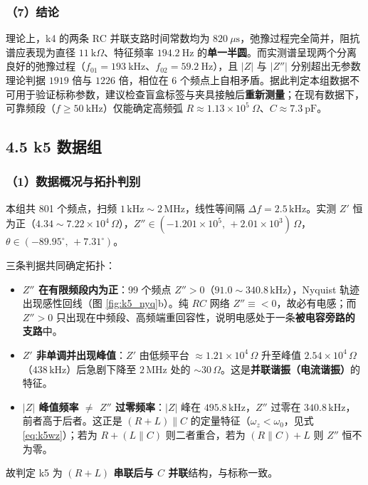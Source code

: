\documentclass[12pt,a4paper]{ctexart}
\begin{document}
\subsubsection*{（7）结论}
理论上，k4 的两条 RC 并联支路时间常数均为 $820\ \mu\mathrm{s}$，弛豫过程完全简并，阻抗谱应表现为直径 $11\ \mathrm{k}\Omega$、特征频率 $194.2\ \mathrm{Hz}$ 的\textbf{单一半圆}。而实测谱呈现两个分离良好的弛豫过程（$f_{01}=193\ \mathrm{kHz}$、$f_{02}=59.2\ \mathrm{Hz}$），且 $|Z|$ 与 $|Z''|$ 分别超出无参数理论判据 $1919$ 倍与 $1226$ 倍，相位在 6 个频点上自相矛盾。据此判定本组数据不可用于验证标称参数，建议检查盲盒标签与夹具接触后\textbf{重新测量}；在现有数据下，可靠频段（$f\ge50\ \mathrm{kHz}$）仅能确定高频弧 $R\approx1.13\times10^5\ \Omega$、$C\approx7.3\ \mathrm{pF}$。

\subsection*{4.5 k5 数据组}

\subsubsection*{（1）数据概况与拓扑判别}
本组共 801 个频点，扫频 $1\,\mathrm{kHz}\sim2\,\mathrm{MHz}$，线性等间隔 $\Delta f=2.5\,\mathrm{kHz}$。实测 $Z'$ 恒为正（$4.34\sim7.22\times10^{4}\,\Omega$），$Z''\in(-1.201\times10^{5},\,+2.01\times10^{3})\,\Omega$，$\theta\in(-89.95^\circ,\,+7.31^\circ)$。

三条判据共同确定拓扑：

\begin{itemize}
    \item \textbf{$Z''$ 在有限频段内为正}：99 个频点 $Z''>0$（$91.0\sim340.8\,\mathrm{kHz}$），Nyquist 轨迹出现感性回线（图 \ref{fig:k5_nyq}b）。纯 $RC$ 网络 $Z''\equiv<0$，故必有电感；而 $Z''>0$ 只出现在中频段、高频端重回容性，说明电感处于一条\textbf{被电容旁路的支路}中。
    \item \textbf{$Z'$ 非单调并出现峰值}：$Z'$ 由低频平台 $\approx1.21\times10^{4}\,\Omega$ 升至峰值 $2.54\times10^{4}\,\Omega$（$438\,\mathrm{kHz}$）后急剧下降至 $2\,\mathrm{MHz}$ 处的 $\sim30\,\Omega$。这是\textbf{并联谐振（电流谐振）}的特征。
    \item \textbf{$|Z|$ 峰值频率 $\ne$ $Z''$ 过零频率}：$|Z|$ 峰在 $495.8\,\mathrm{kHz}$，$Z''$ 过零在 $340.8\,\mathrm{kHz}$，前者高于后者。这正是 $(R+L)\parallel C$ 的定量特征（$\omega_z<\omega_0$，见式 \ref{eq:k5wz}）；若为 $R+(L\parallel C)$ 则二者重合，若为 $(R\parallel C)+L$ 则 $Z''$ 恒不为零。
\end{itemize}
故判定 k5 为 \textbf{$(R+L)$ 串联后与 $C$ 并联}结构，与标称一致。
\end{document}
